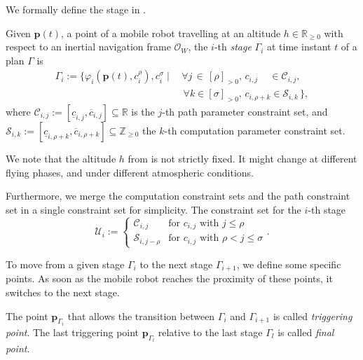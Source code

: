 We formally define the stage in .

\begin{highlight}  
  \begin{defn}[Stage]\label{def:stage}
    Given $\mathbf{p}(t)$, a point of a mobile robot travelling at an altitude $h\in\mathbb{R}_{\geq 0}$ with respect to an inertial navigation frame $\mathcal{O}_W$, the $i$-th \emph{stage} $\Gamma_i$ at time instant $t$ of a plan $\Gamma$ is
    \begin{equation*}\begin{split}
      \Gamma_i:=\{\varphi_i(\mathbf{p}(t),c_i^\rho),c_i^\sigma\mid
      \,&\forall j\,\in\,[\rho]_{>0},\,c_{i,j}\,\,\,\,\,\,\,\in\mathcal{C}_{i,j},\,\\
        &\,\forall k\in[\sigma]_{>0},\,c_{i,\rho+k}\in\mathcal{S}_{i,k}\,\},
    \end{split}\end{equation*}
    where $\mathcal{C}_{i,j}:=[\underline{c}_{i,j},\overline{c}_{i,j}]\subseteq\mathbb{R}$ is the $j$-th path parameter constraint set, and $\mathcal{S}_{i,k}:=[\underline{c}_{i,\rho+k},\overline{c}_{i,\rho+k}]\subseteq\mathbb{Z}_{\geq 0}$ the $k$-th computation parameter constraint set.
  \end{defn}
\end{highlight}

We note that the altitude $h$ from  is not strictly fixed. It might change at different flying phases, and under different atmospheric conditions.

Furthermore, we merge the computation constraint sets and the path constraint set in a single constraint set for simplicity. The constraint set for the $i$-th stage
\begin{equation}\label{eq:constraint-set}
  \mathcal{U}_i:=\begin{cases}
  \mathcal{C}_{i,j} & \text{for } c_{i,j} \text{ with } j\leq\rho\\
  \mathcal{S}_{i,j-\rho} & \text{for } c_{i,j} \text{ with } \rho<j\leq\sigma
\end{cases}.\end{equation}

To move from a given stage $\Gamma_i$ to the next stage $\Gamma_{i+1}$, we define some specific points. As soon as the mobile robot reaches the proximity of these points, it switches to the next stage.

\begin{highlight}  
  \begin{defn}\label{def:trigs}
    The point $\mathbf{p}_{\Gamma_{i}}$ that allows the transition between $\Gamma_i$ and $\Gamma_{i+1}$ is called \emph{triggering point}. The last triggering point $\mathbf{p}_{\Gamma_{l}}$ relative to the last stage $\Gamma_l$ is called \emph{final point}.
  \end{defn}
\end{highlight}

